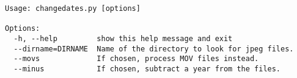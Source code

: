 \begin{verbatim}
Usage: changedates.py [options]

Options:
  -h, --help         show this help message and exit
  --dirname=DIRNAME  Name of the directory to look for jpeg files.
  --movs             If chosen, process MOV files instead.
  --minus            If chosen, subtract a year from the files.
\end{verbatim}
